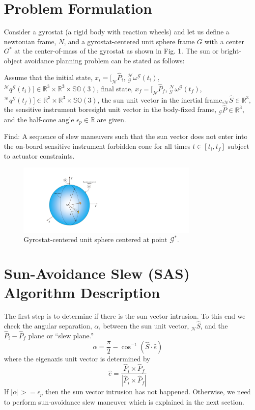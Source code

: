 \documentclass[letterpaper, preprint, paper,11pt]{AAS}	%
\begin{document}
\section{Problem Formulation}
Consider a gyrostat (a rigid body with reaction wheels) and let us define a newtonian frame, $N$, and a gyrostat-centered unit sphere frame $G$ with a center $G^*$ at the center-of-mass of the gyrostat as shown in Fig. 1. The sun or bright-object avoidance planning problem can be stated as follows: 

Assume that the initial state, 
$x_i = \big[_\mathcal{N} \hat{P}_i$, $^\mathcal{N}_\mathcal{G} \omega^\mathcal{G}(t_i)$, $^\mathcal{N}q^\mathcal{G}(t_i)\big] \in \mathbb{R}^3 \times \mathbb{R}^3 \times \mathbb{SO}(3)$, final state, $x_f = \big[_\mathcal{N}\hat{P}_f$, $^\mathcal{N}_\mathcal{G}\omega^\mathcal{G}(t_f)$, $^\mathcal{N}q^\mathcal{G}(t_f) \big]\in \mathbb{R}^3\times \mathbb{R}^3\times \mathbb{SO}(3)$, the sun unit vector in the inertial frame,$_\mathcal{N}\hat{S}\in \mathbb{R}^3$, the sensitive instrument boresight unit vector in the body-fixed frame, $_\mathcal{G}\hat{P}\in \mathbb{R}^3$,  and the half-cone angle $\epsilon_p\in \mathbb{R}$ are given. 

Find:  A sequence of slew maneuvers such that the sun vector does not enter into the on-board sensitive instrument forbidden cone for all times $t\in [t_i, t_f]$ subject to actuator constraints.
		\begin{figure}[htb]
			\begin{center}
				\includegraphics[width=3.5in]{./Figures/SASSchematic1}
				\caption{Gyrostat-centered unit sphere centered at point $\mathcal{G^*}$. }
			\end{center}
		\end{figure}
		
\section{Sun-Avoidance Slew (SAS) Algorithm Description} 
	The first step is to determine if there is the sun vector intrusion. To this end we check the angular separation, $\alpha$, between the sun unit vector, $_\mathcal{N}\hat{S}$, and the $\hat{P}_i-\hat{P}_f$ plane or ``slew plane.''
		\begin{equation}
		\alpha=\frac{\pi}{2}-\cos^{-1}(\hat{S}\cdot\hat{e})
		\end{equation}
		where the eigenaxis unit vector is determined by
		\begin{equation}\label{eaxis}
		\hat{e}=\frac{\hat{P}_i\times\hat{P}_f}{|\hat{P}_i\times \hat{P}_f|}
		\end{equation} 
If $|\alpha|>=\epsilon_p$ then the sun vector intrusion has not happened. Otherwise, we need to perform sun-avoidance slew maneuver which is explained in the next section.
	
\end{document}
